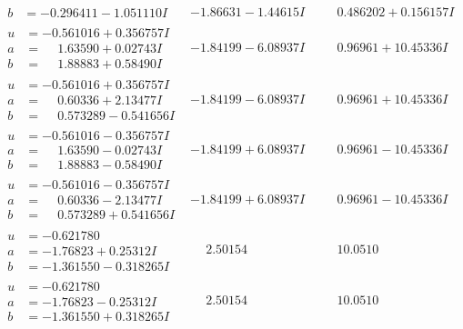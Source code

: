 \documentclass[1p]{elsarticle_modified}
\theoremstyle{definition}
\begin{document}
$$\begin{array}{c|c|c}
\begin{aligned}
b &= -0.296411 - 1.051110 I\end{aligned}
 & -1.86631 - 1.44615 I & \phantom{-}0.486202 + 0.156157 I \\ \hline\begin{aligned}
u &= -0.561016 + 0.356757 I \\
a &= \phantom{-}1.63590 + 0.02743 I \\
b &= \phantom{-}1.88883 + 0.58490 I\end{aligned}
 & -1.84199 - 6.08937 I & \phantom{-}0.96961 + 10.45336 I \\ \hline\begin{aligned}
u &= -0.561016 + 0.356757 I \\
a &= \phantom{-}0.60336 + 2.13477 I \\
b &= \phantom{-}0.573289 - 0.541656 I\end{aligned}
 & -1.84199 - 6.08937 I & \phantom{-}0.96961 + 10.45336 I \\ \hline\begin{aligned}
u &= -0.561016 - 0.356757 I \\
a &= \phantom{-}1.63590 - 0.02743 I \\
b &= \phantom{-}1.88883 - 0.58490 I\end{aligned}
 & -1.84199 + 6.08937 I & \phantom{-}0.96961 - 10.45336 I \\ \hline\begin{aligned}
u &= -0.561016 - 0.356757 I \\
a &= \phantom{-}0.60336 - 2.13477 I \\
b &= \phantom{-}0.573289 + 0.541656 I\end{aligned}
 & -1.84199 + 6.08937 I & \phantom{-}0.96961 - 10.45336 I \\ \hline\begin{aligned}
u &= -0.621780\phantom{ +0.000000I} \\
a &= -1.76823 + 0.25312 I \\
b &= -1.361550 - 0.318265 I\end{aligned}
 & \phantom{-}2.50154\phantom{ +0.000000I} & \phantom{-}10.0510\phantom{ +0.000000I} \\ \hline\begin{aligned}
u &= -0.621780\phantom{ +0.000000I} \\
a &= -1.76823 - 0.25312 I \\
b &= -1.361550 + 0.318265 I\end{aligned}
 & \phantom{-}2.50154\phantom{ +0.000000I} & \phantom{-}10.0510\phantom{ +0.000000I} \\ \hline\begin{aligned}

\end{aligned}
\end{array}$$
\end{document}
